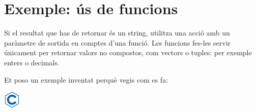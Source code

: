 \documentclass[]{book}
\begin{document}
\hypertarget{exemple-us-de-funcions}{%
\section{Exemple: ús de funcions}\label{exemple-us-de-funcions}}

Si el resultat que has de retornar és un string, utilitza una acció amb un paràmetre de sortida en comptes d'una funció. Les funcions fes-les servir únicament per retornar valors no compostos, com vectors o tuples: per exemple enters o decimals.

Et poso un exemple inventat perquè vegis com es fa:

\includegraphics{./img/c.png}
\end{document}
